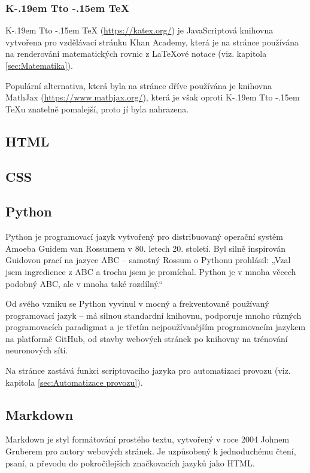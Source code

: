 \documentclass[a4paper, 12pt]{article}
\makeatletter
\DeclareRobustCommand{\KaTeX}{%
  K\kern -.19em
  {\sbox \z@ T\vbox to\ht \z@ {\hbox{%
  \check@mathfonts
  \fontsize\sf@size\z@
  \selectfont A}%
  \vss}%
}\kern -.15em
\TeX}
\makeatother
\begin{document}
  \subsubsection{\texorpdfstring{\KaTeX}{KaTeX}} \label{sec:KaTeX}
  \KaTeX{} (\url{https://katex.org/}) je JavaScriptová knihovna vytvořena pro vzdělávací stránku Khan Academy, která je na stránce používána na renderování matematických rovnic z \LaTeX ové notace (viz. kapitola \ref{sec:Matematika}).

  Populární alternativa, která byla na stránce dříve používána je knihovna MathJax (\url{https://www.mathjax.org/}), která je však oproti \KaTeX u znatelně pomalejší, proto jí byla nahrazena\cite{katex-mathjax-comparison}.


  \subsection{HTML} \label{sec:HTML}

  \subsection{CSS} \label{sec:CSS}

  \subsection{Python} \label{sec:Python}
  Python je programovací jazyk vytvořený pro distribuovaný operační systém Amoeba Guidem van Rossumem v 80. letech 20. století. Byl silně inspirován Guidovou prací na jazyce ABC -- samotný Rossum o Pythonu prohlásil: „Vzal jsem ingredience z ABC a trochu jsem je promíchal. Python je v mnoha věcech podobný ABC, ale v mnoha také rozdílný.\cite{making-of-python}“

  Od svého vzniku se Python vyvinul v mocný a frekventovaně používaný programovací jazyk -- má silnou standardní knihovnu, podporuje mnoho různých programovacích paradigmat a je třetím nejpoužívanějším programovacím jazykem na platformě GitHub\cite{github-statistics}, od stavby webových stránek po knihovny na trénování neuronových sítí.

  Na stránce zastává funkci scriptovacího jazyka pro automatizaci provozu (viz. kapitola \ref{sec:Automatizace provozu}).


  \subsection{Markdown} \label{sec:Markdown}
  Markdown je styl formátování prostého textu, vytvořený v roce 2004 Johnem Gruberem pro autory webových stránek. Je uzpůsobený k jednoduchému čtení, psaní, a převodu do pokročilejších značkovacích jazyků jako HTML\cite{markdown-history}.
\end{document}
